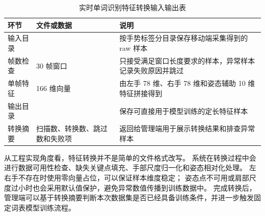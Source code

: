 \begin{table}[H]
  \centering
  \caption{实时单词识别特征转换输入输出表}
  \label{tab:chapter06-realtime-feature-conversion-io}
  \begin{tabular}{L{0.18\textwidth} L{0.30\textwidth} L{0.42\textwidth}}
    \toprule
    环节 & 文件或数据 & 说明 \\
    \midrule
    输入目录 &  & 按手势标签分目录保存移动端采集得到的 raw 样本 \\
    帧数检查 & 30 帧窗口 & 只接受满足窗口长度要求的样本，异常样本记录失败原因并跳过 \\
    单帧特征 & 166 维向量 & 由左手 78 维、右手 78 维和姿态辅助 10 维特征拼接得到 \\
    输出目录 &  & 保存可直接用于模型训练的定长特征样本 \\
    转换摘要 & 扫描数、转换数、跳过数和失败项 & 返回给管理端用于展示转换结果和排查异常样本 \\
    \bottomrule
  \end{tabular}
\end{table}

从工程实现角度看，特征转换并不是简单的文件格式改写。
系统在转换过程中会进行数据可用性检查、缺失关键点填充、手部尺度归一化和姿态相对化处理。
左右手不存在时使用零向量占位，可以保证样本维度稳定；
姿态点不可用或肩部尺度过小时也会采用默认值保护，避免异常数值传播到训练数据中。
完成转换后，管理端可以基于转换摘要判断本次数据集是否已经具备训练条件，并进一步触发固定词表模型训练流程。
